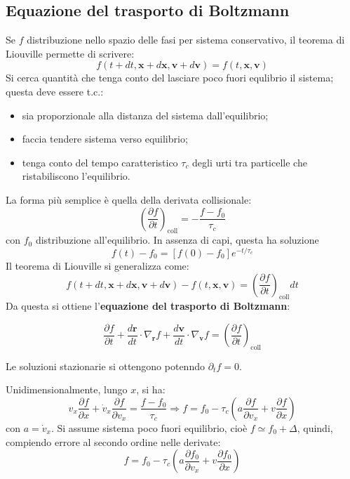 \documentclass[10pt, a4paper]{scrartcl}
\numberwithin{equation}{subsection}
\theoremstyle{style1}
\newenvironment{boxenv}[1][]{
    \begin{eqbox}[#1]
    }{
   \end{eqbox}
}
\begin{document}
\subsection{Equazione del trasporto di Boltzmann}
Se $f$ distribuzione nello spazio delle fasi per sistema conservativo, il teorema di Liouville permette di scrivere:
\[
f(t+ dt , \mathbf{x} + d\mathbf{x} , \mathbf{v} +d \mathbf{v} ) = f(t,\mathbf{x} ,\mathbf{v} )
\] 
Si cerca quantit\`a che tenga conto del lasciare poco fuori equlibrio il sistema; questa deve essere t.c.:
\begin{itemize}
	\item  sia proporzionale alla distanza del sistema dall'equilibrio;
	\item faccia tendere sistema verso equilibrio;
	\item tenga conto del tempo caratteristico $\tau _c$ degli urti tra particelle che ristabiliscono l'equilibrio.
\end{itemize}
La forma pi\`u semplice \`e quella della derivata collisionale:
\begin{equation}
	\left(\frac{\partial f}{\partial t} \right) _\text{coll} = - \frac{f-f_0}{\tau _c}
\end{equation}
con $f_0$ distribuzione all'equilibrio. In assenza di capi, questa ha soluzione
\begin{equation}
	f(t) - f_0 = \left[ f(0) - f_0 \right] e^{-t  / \tau _c} 
\end{equation}
Il teorema di Liouville si generalizza come:
\begin{equation}
	f(t + dt, \mathbf{x} + d\mathbf{x} , \mathbf{v} + d\mathbf{v} ) - f(t, \mathbf{x} , \mathbf{v} ) = \left(\frac{\partial f}{\partial t} \right) _\text{coll} dt
\end{equation}
Da questa si ottiene l'\textbf{equazione del trasporto di Boltzmann}:
\begin{boxenv}[]
\begin{equation}
	\frac{\partial f}{\partial t} + \frac{d \mathbf{r} }{d t} \cdot \nabla _\mathbf{r} f + \frac{d \mathbf{v} }{d t} \cdot \nabla _\mathbf{v} f = \left(\frac{\partial f}{\partial t} \right) _\text{coll}
\end{equation}
\end{boxenv}
\noindent Le soluzioni stazionarie si ottengono potenndo $\partial _t f = 0$.

Unidimensionalmente, lungo $x$, si ha:
\[
v_x \frac{\partial f }{\partial x}  + \dot{v}_x \frac{\partial f}{\partial v_x}  = \frac{f- f_0}{\tau _c}\Rightarrow f = f_0 - \tau _c \left(a \frac{\partial f}{\partial v_x} + v \frac{\partial f}{\partial x} \right) 
\] 
con $a = \dot{v}_x$. Si assume sistema poco fuori equilibrio, cio\`e $f \simeq f_0 + \Delta $, quindi, compiendo errore al secondo ordine nelle derivate:
\begin{equation}
	f = f_0 - \tau _c \left(a \frac{\partial f_0}{\partial v_x}  + v \frac{\partial f_0}{\partial x} \right) 
\end{equation}
\end{document}
